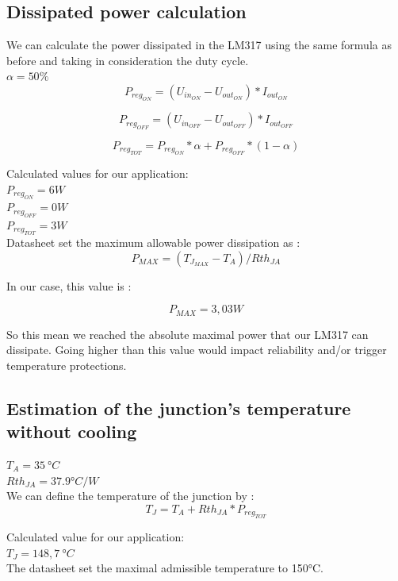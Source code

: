 \clearpage

\subsection{Dissipated power calculation} \label{ssec:num14}
{
	We can calculate the power dissipated in the LM317 using the same formula as before and taking in consideration the duty cycle. \\
	$\alpha = 50\% $ \\
	
	\begin{equation}
		P_{reg_{ON}} = (U_{in_{ON}} - U_{out_{ON}})*I_{out_{ON}}
	\end{equation}
	
	\begin{equation}
		P_{reg_{OFF}} = (U_{in_{OFF}} - U_{out_{OFF}})*I_{out_{OFF}}
	\end{equation}
	
	\begin{equation}
		P_{reg_{TOT}} = P_{reg_{ON}}*\alpha + P_{reg_{OFF}} * (1-\alpha)
	\end{equation}
	
	Calculated values for our application:\\
	$ P_{reg_{ON}} = 6 W $ \\
	$ P_{reg_{OFF}}  = 0 W $ \\
	$ P_{reg_{TOT}} = 3 W $ \\
	
	Datasheet set the maximum allowable power dissipation as : \\
	
	\begin{equation}
		P_{MAX} = (T_{J_{MAX}} - T_{A}) / Rth_{JA}
	\end{equation}

	In our case, this value is :
	
	\begin{equation}
	P_{MAX} = 3,03 W
	\end{equation}

	So this mean we reached the absolute maximal power that our LM317 can dissipate. Going higher than this value would impact reliability and/or trigger temperature protections.

}

\clearpage

\subsection{Estimation of the junction's temperature without cooling} \label{ssec:num15}
{
	$ T_{A} = 35 \ °C $ \\
	$ Rth_{JA} = 37.9 °C/W $\\
	We can define the temperature of the junction by :
	\begin{equation*}
		T_{J} = T_{A} + Rth_{JA} * P_{reg_{TOT}}
	\end{equation*}
	
	Calculated value for our application:\\
	$ T_{J} = 148,7 \ °C $ \\
	
	The datasheet set the maximal admissible temperature to 150°C.
}
